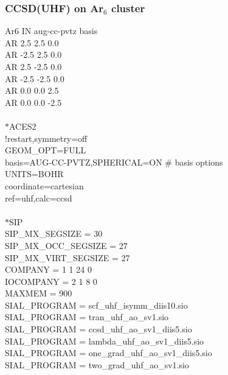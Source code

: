\documentclass[12pt]{article}
\begin{document}
\subsubsection{CCSD(UHF) on Ar$_6$ cluster}
Ar6 IN aug-cc-pvtz basis\\ 
AR  2.5  2.5  0.0\\
AR -2.5  2.5  0.0\\
AR  2.5 -2.5  0.0\\
AR -2.5 -2.5  0.0\\
AR  0.0  0.0  2.5\\
AR  0.0  0.0 -2.5\\
\\
$*$ACES2\\ 
!restart,symmetry=off\\ 
GEOM\_OPT=FULL\\ 
basis=AUG-CC-PVTZ,SPHERICAL=ON \# basis options\\ 
UNITS=BOHR\\
coordinate=cartesian\\ 
ref=uhf,calc=ccsd\\ 
\\
$*$SIP\\ 
SIP\_MX\_SEGSIZE      = 30\\ 
SIP\_MX\_OCC\_SEGSIZE  = 27\\
SIP\_MX\_VIRT\_SEGSIZE = 27\\
COMPANY   = 1 1 24 0\\
IOCOMPANY = 2 1  8 0\\
MAXMEM    = 900\\
SIAL\_PROGRAM = scf\_uhf\_isymm\_diis10.sio\\
SIAL\_PROGRAM = tran\_uhf\_ao\_sv1.sio\\
SIAL\_PROGRAM = ccsd\_uhf\_ao\_sv1\_diis5.sio\\
SIAL\_PROGRAM = lambda\_uhf\_ao\_sv1\_diis5.sio\\
SIAL\_PROGRAM = one\_grad\_uhf\_ao\_sv1\_diis5.sio\\
SIAL\_PROGRAM = two\_grad\_uhf\_ao\_sv1.sio\\


\newpage 



\noindent 
\end{document}
